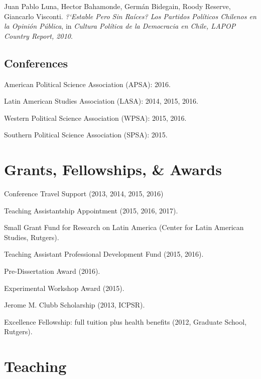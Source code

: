 \documentclass[letterpaper]{article}
\renewenvironment{itemize}{
  \begin{list}{}{
    \setlength{\leftmargin}{1.5em}
  }
}{
  \end{list}
}
\begin{document}
\begin{itemize}
\item Juan Pablo Luna, Hector Bahamonde, Germ\'an Bidegain, Roody Reserve, Giancarlo Visconti. \emph{?`Estable Pero Sin Ra\'ices? Los Partidos Pol\'iticos Chilenos en la Opini\'on P\'ublica}, in \emph{Cultura Pol\'itica de la Democracia en Chile, LAPOP Country Report, 2010}.
\end{itemize}

\subsection*{Conferences}

\begin{itemize}
\item American Political Science Association (APSA): 2016.
\item Latin American Studies Association (LASA): 2014, 2015, 2016.
\item Western Political Science Association (WPSA): 2015, 2016.
\item Southern Political Science Association (SPSA): 2015.
\end{itemize}


\section*{Grants, Fellowships, \& Awards}

\begin{itemize}
\item Conference Travel Support (2013, 2014, 2015, 2016)
\item Teaching Assistantship Appointment (2015, 2016, 2017).
\item Small Grant Fund for Research on Latin America (Center for Latin American Studies, Rutgers).
\item Teaching Assistant Professional Development Fund (2015, 2016).
\item Pre-Dissertation Award (2016).
\item Experimental Workshop Award (2015).
\item Jerome M. Clubb Scholarship (2013, ICPSR).
\item Excellence Fellowship: full tuition plus health benefits (2012, Graduate School, Rutgers).
\end{itemize}


\section*{Teaching}
\end{document}
